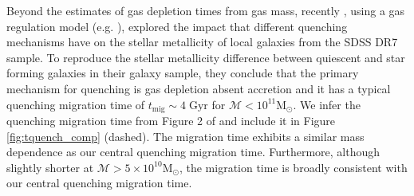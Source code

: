 Beyond the estimates of gas depletion times from gas mass, 
recently \cite{Peng:2015aa}, using a gas regulation model 
(e.g. \citealt{Lilly:2013aa, Peng:2014aa}), explored the impact that 
different quenching mechanisms have on the stellar metallicity 
of local galaxies from the SDSS DR7 sample. To reproduce the stellar
metallicity difference between quiescent and star forming galaxies 
in their galaxy sample, they conclude that the primary mechanism for 
quenching is gas depletion absent accretion and it has a typical quenching 
migration time of $t_\mathrm{mig} \sim 4\;\mathrm{Gyr}$ for 
$\mathcal{M} < 10^{11}\mathrm{M}_\odot$. 
We infer the quenching migration time from Figure 2 of \cite{Peng:2015aa}
and include it in Figure \ref{fig:tquench_comp} (dashed). 
The \cite{Peng:2015aa} migration time exhibits a similar mass 
dependence as our central quenching migration time. Furthermore, 
although slightly shorter at $\mathcal{M} > 5 \times 10^{10} \mathrm{M}_\odot$, 
the migration time is broadly consistent with our central 
quenching migration time.


